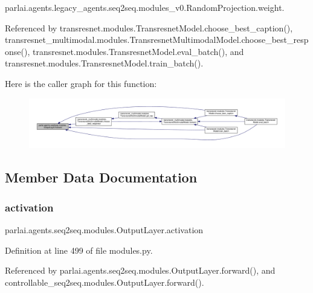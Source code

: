 parlai.\+agents.\+legacy\+\_\+agents.\+seq2seq.\+modules\+\_\+v0.\+Random\+Projection.\+weight.



Referenced by transresnet.\+modules.\+Transresnet\+Model.\+choose\+\_\+best\+\_\+caption(), transresnet\+\_\+multimodal.\+modules.\+Transresnet\+Multimodal\+Model.\+choose\+\_\+best\+\_\+response(), transresnet.\+modules.\+Transresnet\+Model.\+eval\+\_\+batch(), and transresnet.\+modules.\+Transresnet\+Model.\+train\+\_\+batch().

Here is the caller graph for this function\+:
\nopagebreak
\begin{figure}[H]
\begin{center}
\leavevmode
\includegraphics[width=350pt]{classparlai_1_1agents_1_1seq2seq_1_1modules_1_1OutputLayer_a730001f010633b53df7f7d96a75d8812_icgraph}
\end{center}
\end{figure}


\subsection{Member Data Documentation}
\mbox{\label{classparlai_1_1agents_1_1seq2seq_1_1modules_1_1OutputLayer_a0654abd36d1e9fc9425ac366ded9d624}} 
\subsubsection{\texorpdfstring{activation}{activation}}
{\footnotesize\ttfamily parlai.\+agents.\+seq2seq.\+modules.\+Output\+Layer.\+activation}



Definition at line 499 of file modules.\+py.



Referenced by parlai.\+agents.\+seq2seq.\+modules.\+Output\+Layer.\+forward(), and controllable\+\_\+seq2seq.\+modules.\+Output\+Layer.\+forward().

